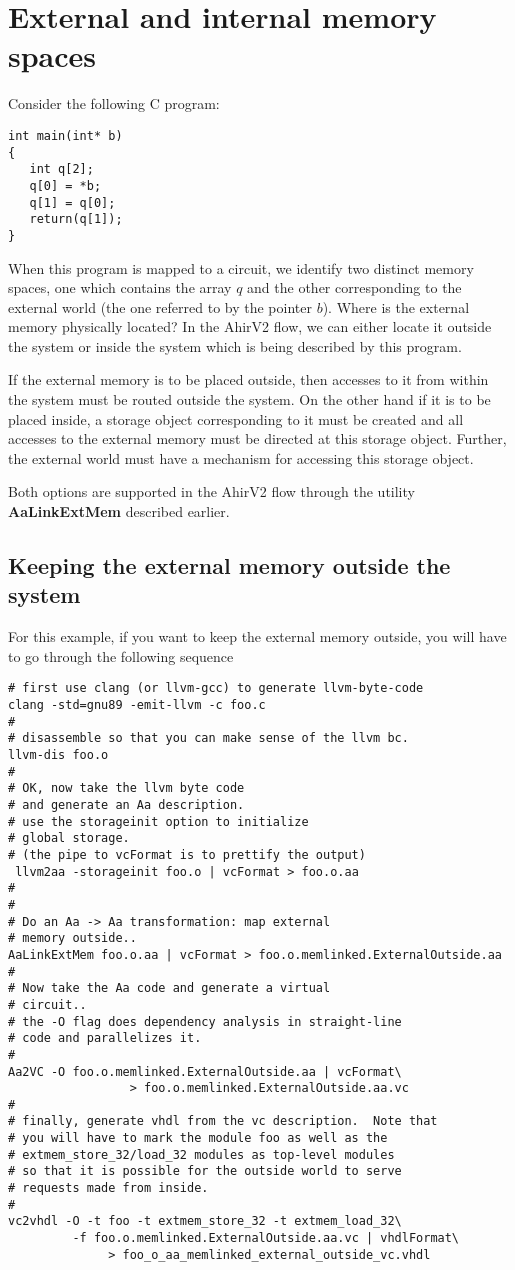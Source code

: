 \documentclass{article}
\begin{document}
\section{External and internal memory spaces}

Consider the following C program:
\begin{verbatim}
int main(int* b)
{
   int q[2];
   q[0] = *b;
   q[1] = q[0];
   return(q[1]);
}
\end{verbatim}
When this program is mapped to a circuit, we identify 
two distinct memory spaces, one which contains the
array $q$ and the other corresponding to the 
external world (the one referred to by the pointer $b$).
Where is the external memory physically located?  In 
the AhirV2 flow, we can either locate it outside
the system or inside the system which is being 
described by this program.

If the external memory is to be placed outside, then
accesses to it from within the system must be routed
outside the system.  On the other hand if it is
to be placed inside, a storage object corresponding 
to it must be created and all accesses to the external
memory must be directed at this storage object.
Further, the external world must have a mechanism for
accessing this storage object.

Both options are supported in the AhirV2 flow through
the utility {\bf AaLinkExtMem} described earlier.


\subsection{Keeping the external memory outside the system}

For this example, if you want to keep the external memory
outside, you will have to go through the following sequence
\begin{verbatim}
# first use clang (or llvm-gcc) to generate llvm-byte-code
clang -std=gnu89 -emit-llvm -c foo.c
#
# disassemble so that you can make sense of the llvm bc.
llvm-dis foo.o
#
# OK, now take the llvm byte code
# and generate an Aa description.
# use the storageinit option to initialize
# global storage.
# (the pipe to vcFormat is to prettify the output)
 llvm2aa -storageinit foo.o | vcFormat > foo.o.aa
#
#
# Do an Aa -> Aa transformation: map external
# memory outside..
AaLinkExtMem foo.o.aa | vcFormat > foo.o.memlinked.ExternalOutside.aa
#
# Now take the Aa code and generate a virtual
# circuit..
# the -O flag does dependency analysis in straight-line
# code and parallelizes it.
#
Aa2VC -O foo.o.memlinked.ExternalOutside.aa | vcFormat\
                 > foo.o.memlinked.ExternalOutside.aa.vc
#
# finally, generate vhdl from the vc description.  Note that
# you will have to mark the module foo as well as the
# extmem_store_32/load_32 modules as top-level modules
# so that it is possible for the outside world to serve
# requests made from inside.
#
vc2vhdl -O -t foo -t extmem_store_32 -t extmem_load_32\ 
         -f foo.o.memlinked.ExternalOutside.aa.vc | vhdlFormat\
              > foo_o_aa_memlinked_external_outside_vc.vhdl

\end{verbatim}
\end{document}
